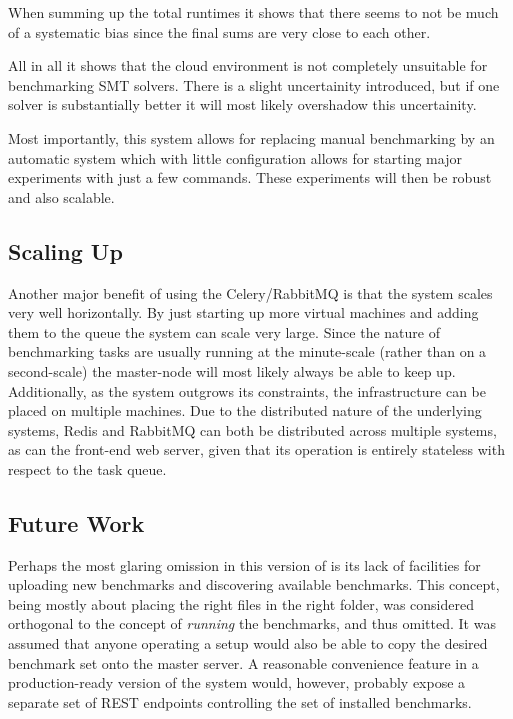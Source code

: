 \documentclass[a4paper]{IEEEtran}
\begin{document}
When summing up the total runtimes it shows that there seems to not be
much of a systematic bias since the final sums are very close to each
other.

All in all it shows that the cloud environment is not completely
unsuitable for benchmarking SMT solvers. There is a slight
uncertainity introduced, but if one solver is substantially better it
will most likely overshadow this uncertainity.

Most importantly, this system allows for replacing manual benchmarking
by an automatic system which with little configuration allows for
starting major experiments with just a few commands. These experiments
will then be robust and also scalable. 

\subsection{Scaling Up}
Another major benefit of using the Celery/RabbitMQ is that the system
scales very well horizontally. By just starting up more virtual
machines and adding them to the queue the system can scale very
large. Since the nature of benchmarking tasks are usually running at
the minute-scale (rather than on a second-scale) the master-node will
most likely always be able to keep up. Additionally, as the system outgrows its
constraints, the infrastructure can be placed on multiple machines. Due to the
distributed nature of the underlying systems, Redis and RabbitMQ can both be
distributed across multiple systems, as can the front-end web server, given that
its operation is entirely stateless with respect to the task queue.

\subsection{Future Work}

Perhaps the most glaring omission in this version of \testbench{} is its lack of
facilities for uploading new benchmarks and discovering available benchmarks.
This concept, being mostly about placing the right files in the right folder,
was considered orthogonal to the concept of \emph{running} the benchmarks, and
thus omitted. It was assumed that anyone operating a \testbench{} setup would
also be able to copy the desired benchmark set onto the master server. A
reasonable convenience feature in a production-ready version of the system
would, however, probably expose a separate set of REST endpoints controlling the
set of installed benchmarks.
\end{document}
